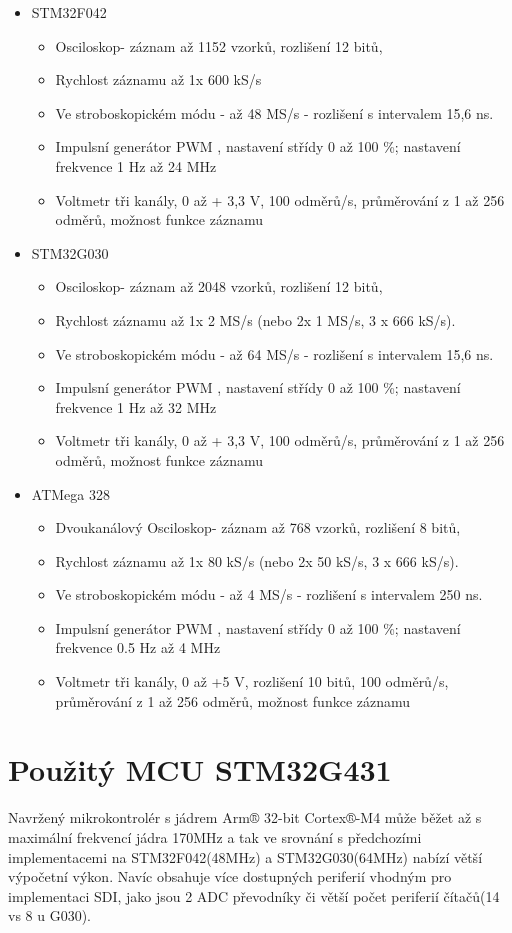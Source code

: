 \begin{itemize}
	\item STM32F042
	\begin{itemize}
		\item Osciloskop- záznam až 1152 vzorků, rozlišení 12 bitů,
		\item Rychlost záznamu až 1x 600 kS/s 
		\item Ve stroboskopickém módu - až  48 MS/s - rozlišení s intervalem 15,6 ns.
		\item Impulsní generátor PWM , nastavení  střídy 0 až 100 \%; nastavení frekvence 1 Hz až 24 MHz
		\item Voltmetr tři kanály, 0 až + 3,3 V, 100 odměrů/s, průměrování z 1 až 256 odměrů, možnost funkce záznamu
	\end{itemize}
	\item STM32G030
	\begin{itemize}
		\item Osciloskop- záznam až 2048 vzorků, rozlišení 12 bitů,
		\item Rychlost záznamu až 1x 2 MS/s (nebo  2x 1 MS/s, 3 x 666 kS/s).
		\item Ve stroboskopickém módu - až  64 MS/s - rozlišení s intervalem 15,6 ns.
		\item Impulsní generátor PWM , nastavení  střídy 0 až 100 \%; nastavení frekvence 1 Hz až 32 MHz
		\item Voltmetr tři kanály, 0 až + 3,3 V, 100 odměrů/s, průměrování z 1 až 256 odměrů, možnost funkce záznamu
	\end{itemize}
	\item  ATMega 328
			\begin{itemize}
		\item Dvoukanálový Osciloskop- záznam až 768 vzorků, rozlišení 8 bitů,
		\item Rychlost záznamu až 1x 80 kS/s (nebo  2x 50 kS/s, 3 x 666 kS/s).
		\item Ve stroboskopickém módu - až  4 MS/s - rozlišení s intervalem 250 ns.
		\item Impulsní generátor PWM , nastavení  střídy 0 až 100 \%; nastavení frekvence 0.5 Hz až 4 MHz
		\item Voltmetr tři kanály, 0 až +5 V, rozlišení 10 bitů, 100 odměrů/s, průměrování z 1 až 256 odměrů, možnost funkce záznamu
	\end{itemize}
	
\end{itemize}

\section{Použitý MCU STM32G431}
Navržený mikrokontrolér s jádrem Arm® 32-bit Cortex®-M4 může běžet až s maximální frekvencí jádra 170MHz a tak ve srovnání s předchozími implementacemi na STM32F042(48MHz) a STM32G030(64MHz) nabízí větší výpočetní výkon. Navíc obsahuje více dostupných periferií vhodným pro implementaci SDI, jako jsou 2 ADC převodníky či větší počet periferií čítačů(14 vs 8 u G030).

